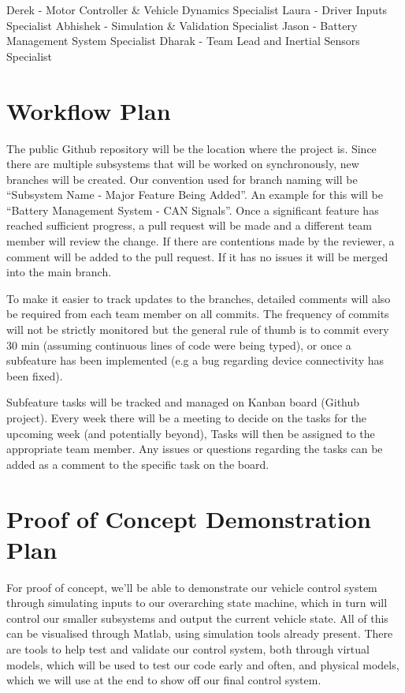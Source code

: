 \documentclass{article}
\begin{document}
Derek - Motor Controller \& Vehicle Dynamics Specialist
Laura - Driver Inputs Specialist
Abhishek - Simulation \& Validation Specialist
Jason - Battery Management System Specialist
Dharak - Team Lead and Inertial Sensors Specialist

\section{Workflow Plan}

The public Github repository will be the location where the project is.
Since there are multiple subsystems that will be worked on synchronously,
new branches will be created. Our convention used for branch naming will be
“Subsystem Name - Major Feature Being Added”. An example for this will be 
“Battery Management System - CAN Signals”. Once a significant feature has 
reached sufficient progress, a pull request will be made and a different 
team member will review the change. If there are contentions made by the 
reviewer, a comment will be added to the pull request. If it has no issues 
it will be merged into the main branch.

To make it easier to track updates to the branches, detailed comments will 
also be required from each team member on all commits. The frequency of 
commits will not be strictly monitored but the general rule of thumb is to
commit every 30 min (assuming continuous lines of code were being typed), 
or once a subfeature has been implemented (e.g a bug regarding device 
connectivity has been fixed). 

Subfeature tasks will be tracked and managed on Kanban board (Github 
project). Every week there will be a meeting to decide on the tasks for the
upcoming week (and potentially beyond), Tasks will then be assigned to the 
appropriate team member. Any issues or questions regarding the tasks can be 
added as a comment to the specific task on the board.

\section{Proof of Concept Demonstration Plan}

For proof of concept, we’ll be able to demonstrate our vehicle control 
system through simulating inputs to our overarching state machine, which in 
turn will control our smaller subsystems and output the current vehicle state. 
All of this can be visualised through Matlab, using simulation tools already 
present. There are tools to help test and validate our control system, both 
through virtual models, which will be used to test our code early and often, 
and physical models, which we will use at the end to show off our final 
control system.
\end{document}
